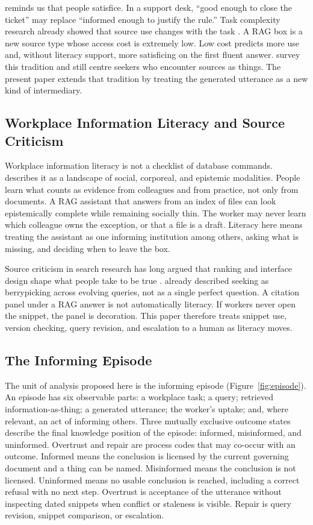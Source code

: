\documentclass{isi2027}
\begin{document}
\citet{Savolainen1995} reminds us that people satisfice. In a support desk, ``good enough to close the ticket'' may replace ``informed enough to justify the rule.'' Task complexity research already showed that source use changes with the task \citep{Bystrom1995}. A RAG box is a new source type whose access cost is extremely low. Low cost predicts more use and, without literacy support, more satisficing on the first fluent answer. \citet{Case2016} survey this tradition and still centre seekers who encounter sources as things. The present paper extends that tradition by treating the generated utterance as a new kind of intermediary.

\subsection{Workplace Information Literacy and Source Criticism}

Workplace information literacy is not a checklist of database commands. \citet{Lloyd2010} describes it as a landscape of social, corporeal, and epistemic modalities. People learn what counts as evidence from colleagues and from practice, not only from documents. A RAG assistant that answers from an index of files can look epistemically complete while remaining socially thin. The worker may never learn which colleague owns the exception, or that a file is a draft. Literacy here means treating the assistant as one informing institution among others, asking what is missing, and deciding when to leave the box.

Source criticism in search research has long argued that ranking and interface design shape what people take to be true \citep{Lewandowski2023}. \citet{Bates1989} already described seeking as berrypicking across evolving queries, not as a single perfect question. A citation panel under a RAG answer is not automatically literacy. If workers never open the snippet, the panel is decoration. This paper therefore treats snippet use, version checking, query revision, and escalation to a human as literacy moves.

\subsection{The Informing Episode}

The unit of analysis proposed here is the informing episode (Figure~\ref{fig:episode}). An episode has six observable parts: a workplace task; a query; retrieved information-as-thing; a generated utterance; the worker's uptake; and, where relevant, an act of informing others. Three mutually exclusive outcome states describe the final knowledge position of the episode: informed, misinformed, and uninformed. Overtrust and repair are process codes that may co-occur with an outcome. Informed means the conclusion is licensed by the current governing document and a thing can be named. Misinformed means the conclusion is not licensed. Uninformed means no usable conclusion is reached, including a correct refusal with no next step. Overtrust is acceptance of the utterance without inspecting dated snippets when conflict or staleness is visible. Repair is query revision, snippet comparison, or escalation.
\end{document}
